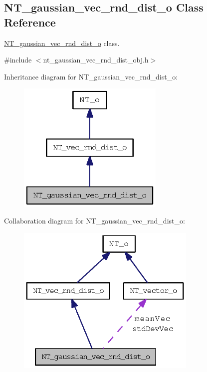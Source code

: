 \subsection{NT\_\-gaussian\_\-vec\_\-rnd\_\-dist\_\-o Class Reference}
\label{class_n_t__gaussian__vec__rnd__dist__o}


\hyperlink{class_n_t__gaussian__vec__rnd__dist__o}{NT\_\-gaussian\_\-vec\_\-rnd\_\-dist\_\-o} class.  




{\ttfamily \#include $<$nt\_\-gaussian\_\-vec\_\-rnd\_\-dist\_\-obj.h$>$}



Inheritance diagram for NT\_\-gaussian\_\-vec\_\-rnd\_\-dist\_\-o:
\nopagebreak
\begin{figure}[H]
\begin{center}
\leavevmode
\includegraphics[width=198pt]{class_n_t__gaussian__vec__rnd__dist__o__inherit__graph}
\end{center}
\end{figure}


Collaboration diagram for NT\_\-gaussian\_\-vec\_\-rnd\_\-dist\_\-o:
\nopagebreak
\begin{figure}[H]
\begin{center}
\leavevmode
\includegraphics[width=244pt]{class_n_t__gaussian__vec__rnd__dist__o__coll__graph}
\end{center}
\end{figure}
